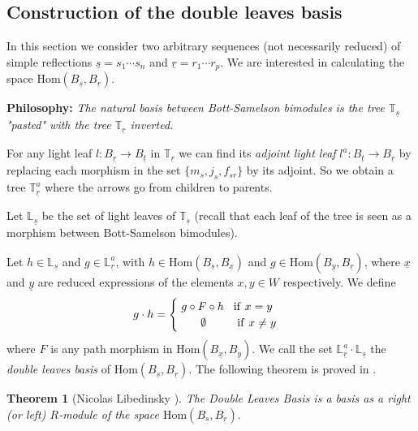 \documentclass[12pt]{wart}
\newtheorem{thm}{Theorem}[section]
\theoremstyle{remark}
\begin{document}
\subsection{Construction of the double leaves basis}\label{LL}




In this section we consider two arbitrary sequences (not necessarily reduced) of simple reflections $\underline{s}=s_1\cdots s_n$ and $\underline{r}=r_1\cdots r_p.$ We are interested in calculating the space  $\mathrm{Hom}(B_{\underline{s}}, B_{\underline{r}})$. 

\vspace{0.3cm}

\textbf{Philosophy: }\emph{The natural basis between Bott-Samelson bimodules is  the tree $\mathbb{T}_{\underline{s}}$   "pasted"  with  the  tree  $\mathbb{T}_{\underline{r}}$ inverted.} 

\vspace{0.3cm}


 
 
 
 For any light leaf $l:B_{\underline{r}}\rightarrow B_{\underline{t}}$ in $\mathbb{T}_{\underline{r}}$ we can find its \emph{adjoint light leaf} $l^a:B_{\underline{t}} \rightarrow  B_{\underline{r}}$ by replacing each morphism in the set $\{m_s, j_s, f_{sr}\}$ by its adjoint. So we obtain a tree $\mathbb{T}_{\underline{r}}^a$ where the arrows go from children to parents.
 

Let  $\mathbb{L}_{\underline{s}}$ be the set of light leaves of $\mathbb{T}_{\underline{s}}$ (recall that each leaf of the tree is seen as a morphism between Bott-Samelson bimodules).  


Let  $h\in \mathbb{L}_{\underline{s}}$ and $g\in \mathbb{L}_{\underline{r}}^a$, with  $h\in\mathrm{Hom}(B_{\underline{s}},B_{\underline{x}})$ and $g \in\mathrm{Hom}(B_{\underline{y}},B_{\underline{r}})$, where $\underline{x}$ and $\underline{y}$ are reduced expressions of the elements $x, y\in W$ respectively. We define
$$g\cdot h=
\begin{cases}
\hspace*{0.1cm} g\circ F\circ  h \hspace*{0.3cm} \mathrm{if}\ x=y\\
\hspace*{0.7cm} \emptyset\hspace*{0.96cm} \mathrm{if}\ x\neq y
\end{cases}$$
where $F$ is any path morphism in $\mathrm{Hom}(B_{\underline{x}}, B_{\underline{y}})$.
 We call the set $\mathbb{L}_{\underline{r}}^a\cdot \mathbb{L}_{\underline{s}}$ the \emph{double leaves basis}  of $\mathrm{Hom}(B_{\underline{s}}, B_{\underline{r}}).$  The following theorem is proved in \cite{li3}.
 \begin{thm}[Nicolas Libedinsky ]\label{LL}
The Double Leaves Basis  is a basis as a  right (or left) $R$-module of the space $\mathrm{Hom}(B_{\underline{s}}, B_{\underline{r}}).$ 
\end{thm}
 
\end{document}
